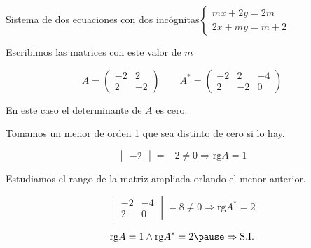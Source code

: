 \documentclass[9pt]{beamer}
\begin{document}
\begin{frame}{Sistema de dos ecuaciones con dos incógnitas$ \begin{cases} mx+2y = 2m \\ 2x+my = m+2 \end{cases}$ }


\pause

Escribimos las matrices con este valor de $m$ 

\pause

\[ A=\begin{pmatrix}
-2 & 2  \\ 2 & -2  
\end{pmatrix} \qquad A^*=\begin{pmatrix}
-2 & 2 & -4 \\ 2 & -2 & 0 
\end{pmatrix} \]

En este caso el determinante de $A$ es  cero.

Tomamos un menor de orden 1 que sea distinto de cero si lo hay.

\pause

\[ \begin{vmatrix}
-2
\end{vmatrix}=-2 \neq 0 \Rightarrow \text{rg}A=1 \]

\pause
Estudiamos el rango de la matriz ampliada orlando el menor anterior.

\[ \begin{vmatrix}
-2 & -4 \\ 2 & 0 
\end{vmatrix}= 8 \neq 0 \Rightarrow \text{rg}A^* =2 \]

\pause

\[ \text{rg}A=1 \wedge \text{rg}A^* =2 \pause \Rightarrow \text{S.I.} \]


\end{frame}
\end{document}
